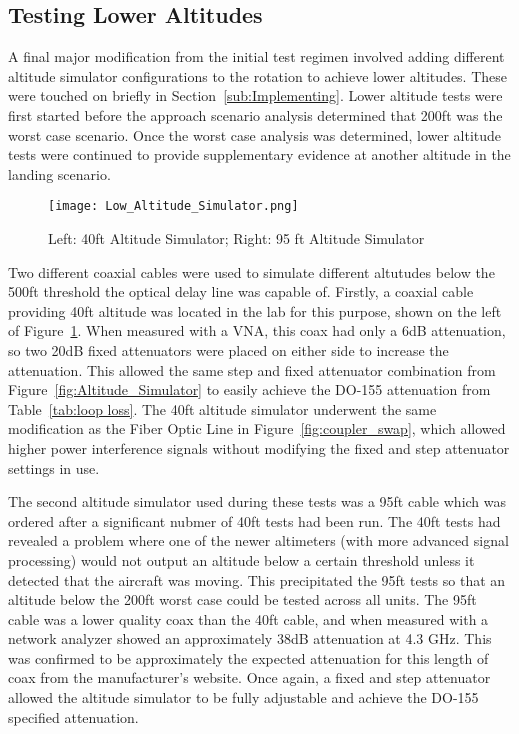 \subsection{Testing Lower Altitudes}
A final major modification from the initial test regimen involved adding different altitude simulator configurations to the rotation to achieve lower altitudes. These were touched on briefly in Section~\ref{sub:Implementing}. Lower altitude tests were first started before the approach scenario analysis determined that 200ft was the worst case scenario. Once the worst case analysis was determined, lower altitude tests were continued to provide supplementary evidence at another altitude in the landing scenario. 
\begin{figure}[ht]
\centering
\texttt{[image: Low\_Altitude\_Simulator.png]}
\caption{Left: 40ft Altitude Simulator; Right: 95 ft Altitude Simulator}

\label{fig:Low_Altitudes}

\end{figure}

Two different coaxial cables were used to simulate different altutudes below the 500ft threshold the optical delay line was capable of. Firstly, a coaxial cable providing 40ft altitude was located in the lab for this purpose, shown on the left of Figure~\ref{fig:Low_Altitudes}. When measured with a VNA, this coax had only a 6dB attenuation, so two 20dB fixed attenuators were placed on either side to increase the attenuation. This allowed the same step and fixed attenuator combination from Figure~\ref{fig:Altitude_Simulator} to easily achieve the DO-155 attenuation from Table~\ref{tab:loop loss}. The 40ft altitude simulator underwent the same modification as the Fiber Optic Line in Figure~\ref{fig:coupler_swap}, which allowed higher power interference signals without modifying the fixed and step attenuator settings in use. 

The second altitude simulator used during these tests was a 95ft cable which was ordered after a significant nubmer of 40ft tests had been run. The 40ft tests had revealed a problem where one of the newer altimeters (with more advanced signal processing) would not output an altitude below a certain threshold unless it detected that the aircraft was moving. This precipitated the 95ft tests so that an altitude below the 200ft worst case could be tested across all units. The 95ft cable was a lower quality coax than the 40ft cable, and when measured with a network analyzer showed an approximately 38dB attenuation at 4.3 GHz. This was confirmed to be approximately the expected attenuation for this length of coax from the manufacturer's website. Once again, a fixed and step attenuator allowed the altitude simulator to be fully adjustable and achieve the DO-155 specified attenuation. 

